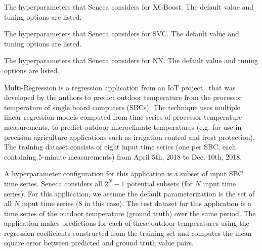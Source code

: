 \begin{table}[t]
\centering

\caption{The hyperparameters that Seneca considers for XGBoost. 
The default value and tuning options are listed. 
\label{tab:xgboost_para}}
\end{table}

\begin{table}[t]
\centering

\caption{The hyperparameters that Seneca considers for SVC. 
The default value and tuning options are listed. 
\label{tab:svc_para}}
\end{table}

\begin{table}[t]
\centering

\caption{The hyperparameters that Seneca considers for NN.
The default value and tuning options are listed. 
\label{tab:nn_para}}
\end{table}


Multi-Regression is a regression application 
from an IoT project~\cite{iot-cpu} that was developed by the authors
to predict outdoor temperature from the processor 
temperature of single board computers (SBCs).  
The technique uses multiple linear regression models computed from time
series of processor temperature measurements,
to predict outdoor microclimate temperatures (e.g. for use in 
precision agriculture applications such as irrigation control and frost protection).
The training dataset consists of eight input time series (one per SBC, each containing 
5-minute measurements) from April 5th, 2018 to Dec. 10th, 2018.

A hyperparameter configuration for this application is a subset of input SBC time series.
Seneca considers all \texttt{$2^N - 1$} potential subsets (for $N$ input time series).
For this application,
we assume the default parameterization is the set of all $N$ input time series (8 in this case).
The test dataset for this application is a time series of the outdoor temperature (ground truth) 
over the same period.  The application makes predictions for each of these outdoor temperatures
using the regression coefficients constructed from the training set
and computes the mean square error between predicted and ground truth value pairs.


